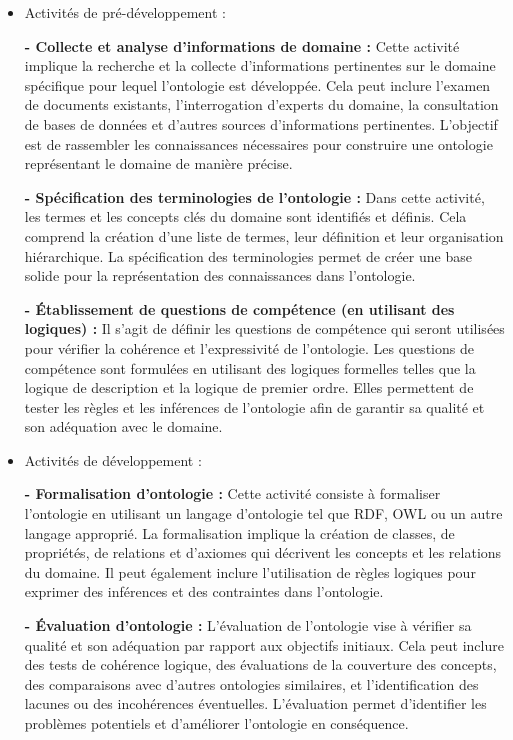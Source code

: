 \documentclass{article}
\begin{document}
	\begin{itemize}
	\item Activités de pré-développement :
	
	\textbf{- Collecte et analyse d'informations de domaine :} Cette activité implique la recherche et la
	collecte d'informations pertinentes sur le domaine spécifique pour lequel l'ontologie est
	développée. Cela peut inclure l'examen de documents existants, l'interrogation d'experts du
	domaine, la consultation de bases de données et d'autres sources d'informations pertinentes.
	L'objectif est de rassembler les connaissances nécessaires pour construire une ontologie
	représentant le domaine de manière précise.
	
	\textbf{- Spécification des terminologies de l'ontologie : }Dans cette activité, les termes et les concepts
	clés du domaine sont identifiés et définis. Cela comprend la création d'une liste de termes, leur
	définition et leur organisation hiérarchique. La spécification des terminologies permet de créer
	une base solide pour la représentation des connaissances dans l'ontologie.
	
	\textbf{- Établissement de questions de compétence (en utilisant des logiques) : }Il s'agit de définir les
	questions de compétence qui seront utilisées pour vérifier la cohérence et l'expressivité de
	l'ontologie. Les questions de compétence sont formulées en utilisant des logiques formelles
	telles que la logique de description et la logique de premier ordre. Elles permettent de tester les
	règles et les inférences de l'ontologie afin de garantir sa qualité et son adéquation avec le
	domaine.
	
	\item Activités de développement :
	
	\textbf{- Formalisation d'ontologie :} Cette activité consiste à formaliser l'ontologie en utilisant un
	langage d'ontologie tel que RDF, OWL ou un autre langage approprié. La formalisation
	implique la création de classes, de propriétés, de relations et d'axiomes qui décrivent les
	concepts et les relations du domaine. Il peut également inclure l'utilisation de règles logiques
	pour exprimer des inférences et des contraintes dans l'ontologie.
	
	\textbf{- Évaluation d'ontologie :} L'évaluation de l'ontologie vise à vérifier sa qualité et son adéquation
	par rapport aux objectifs initiaux. Cela peut inclure des tests de cohérence logique, des
	évaluations de la couverture des concepts, des comparaisons avec d'autres ontologies similaires,
	et l'identification des lacunes ou des incohérences éventuelles. L'évaluation permet d'identifier
	les problèmes potentiels et d'améliorer l'ontologie en conséquence.
	

\end{itemize}
\end{document}
